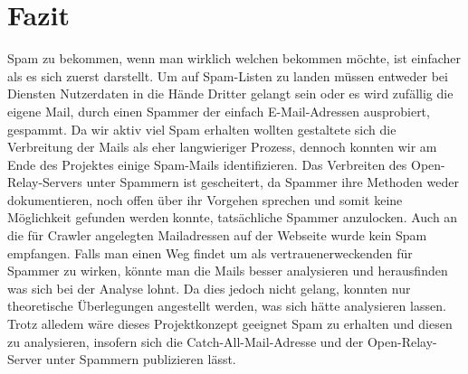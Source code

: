 \documentclass[a4paper,11pt,singlespacing]{article}
\begin{document}
\newpage

	
\section{Fazit}\label{sec:Fazit}
Spam zu bekommen, wenn man wirklich welchen bekommen möchte, ist einfacher als es sich zuerst darstellt. Um auf Spam-Listen zu landen müssen entweder bei Diensten Nutzerdaten in die Hände Dritter gelangt sein oder es wird zufällig die eigene Mail, durch einen Spammer der einfach E-Mail-Adressen ausprobiert, gespammt. Da wir aktiv viel Spam erhalten wollten gestaltete sich die Verbreitung der Mails als eher langwieriger Prozess, dennoch konnten wir am Ende des Projektes einige Spam-Mails identifizieren. 
Das Verbreiten des Open-Relay-Servers unter Spammern ist gescheitert, da Spammer ihre Methoden weder dokumentieren, noch offen über ihr Vorgehen sprechen und somit keine Möglichkeit gefunden werden konnte, tatsächliche Spammer anzulocken. Auch an die für Crawler angelegten Mailadressen auf der Webseite wurde kein Spam empfangen. Falls man einen Weg findet um als vertrauenerweckenden  für Spammer zu wirken, könnte man die Mails besser  analysieren und herausfinden was sich bei der Analyse lohnt. Da dies jedoch nicht gelang, konnten nur theoretische Überlegungen angestellt werden, was sich hätte analysieren lassen. Trotz alledem wäre dieses Projektkonzept geeignet Spam zu erhalten und diesen zu analysieren, insofern sich die Catch-All-Mail-Adresse und der Open-Relay-Server unter Spammern publizieren lässt.

\newpage




\newpage


\listoffigures
{}
\newpage
\end{document}

